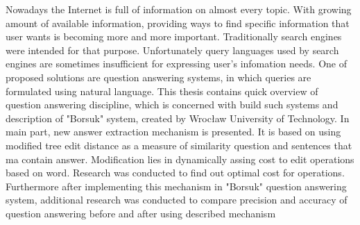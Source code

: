 \documentclass[a4paper, twoside, 12pt]{report}
\newenvironment{abstractpage}
  {\vspace*{\fill}\thispagestyle{empty}}
    {\vfill}
\renewenvironment{abstract}[1]
      {\bigskip\selectlanguage{#1}%
             \begin{center}\bfseries\abstractname\end{center}}
           {\par\bigskip}
\begin{document}
\begin{abstractpage}
\begin{abstract}{english}
    Nowadays the Internet is full of information on almost every topic. With growing amount of available information,
    providing ways to find specific information that user wants is becoming more and more important. Traditionally
    search engines were intended for that purpose. Unfortunately query languages used by search engines are sometimes
    insufficient for expressing user's infomation needs. One of proposed solutions are question answering systems, in which
    queries are formulated using natural language. This thesis contains quick overview of question answering discipline,
    which is concerned with build such systems and description of "Borsuk" system, created by Wrocław University of Technology.
    In main part, new answer extraction mechanism is presented. It is based on using modified tree edit distance as a measure of
    similarity question and sentences that ma contain answer. Modification lies in dynamically assing cost to edit operations
    based on word. Research was conducted to find out optimal cost for operations. Furthermore after implementing this
    mechanism in "Borsuk" question answering system, additional research was conducted to compare precision and accuracy
    of question answering before and after using described mechanism
\end{abstract}
\end{abstractpage}

\tableofcontents

\listoffigures
\end{document}
